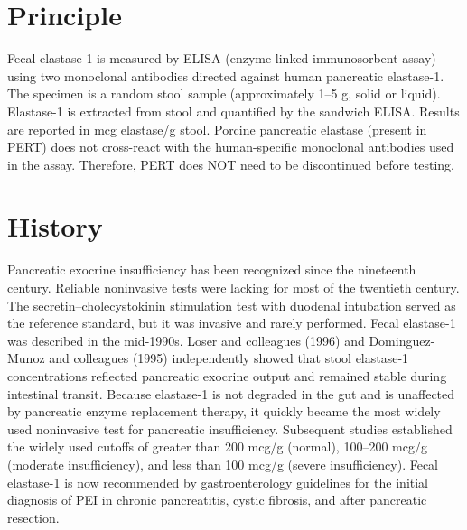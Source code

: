 \section*{Principle}
Fecal elastase-1 is measured by ELISA (enzyme-linked immunosorbent assay) using two monoclonal antibodies directed against human pancreatic elastase-1. The specimen is a random stool sample (approximately 1--5 g, solid or liquid). Elastase-1 is extracted from stool and quantified by the sandwich ELISA. Results are reported in mcg elastase/g stool. Porcine pancreatic elastase (present in PERT) does not cross-react with the human-specific monoclonal antibodies used in the assay. Therefore, PERT does NOT need to be discontinued before testing.
\section*{History}
Pancreatic exocrine insufficiency has been recognized since the nineteenth century. Reliable noninvasive tests were lacking for most of the twentieth century. The secretin--cholecystokinin stimulation test with duodenal intubation served as the reference standard, but it was invasive and rarely performed. Fecal elastase-1 was described in the mid-1990s. Loser and colleagues (1996) and Dominguez-Munoz and colleagues (1995) independently showed that stool elastase-1 concentrations reflected pancreatic exocrine output and remained stable during intestinal transit. Because elastase-1 is not degraded in the gut and is unaffected by pancreatic enzyme replacement therapy, it quickly became the most widely used noninvasive test for pancreatic insufficiency. Subsequent studies established the widely used cutoffs of greater than 200 mcg/g (normal), 100--200 mcg/g (moderate insufficiency), and less than 100 mcg/g (severe insufficiency). Fecal elastase-1 is now recommended by gastroenterology guidelines for the initial diagnosis of PEI in chronic pancreatitis, cystic fibrosis, and after pancreatic resection.
